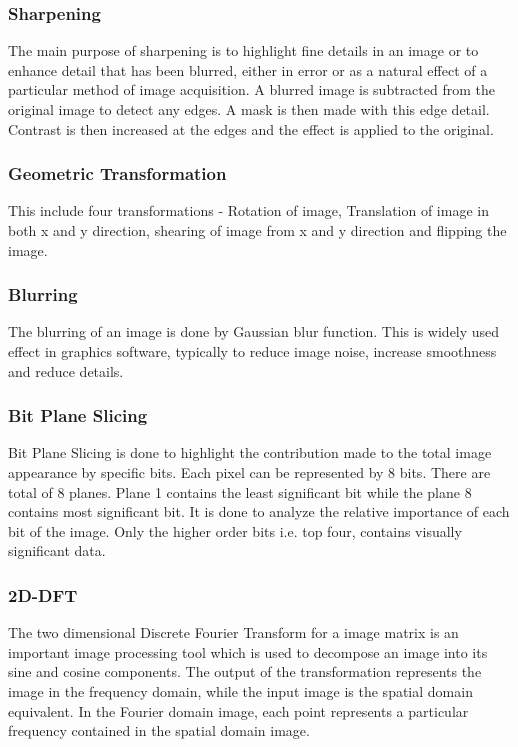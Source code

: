 \subsubsection{Sharpening}
The main purpose of sharpening is to highlight fine details in an image or to enhance detail that has been blurred, either in error or as a natural effect of a particular method of image acquisition. A blurred image is subtracted from the original image to detect any edges. A mask is then made with this edge detail. Contrast is then increased at the edges and the effect is applied to the original.
\\

\subsubsection{Geometric Transformation}
This include four transformations - Rotation of image, Translation of image in both x and y direction, shearing of image from x and y direction and flipping the image.
\\

\subsubsection{Blurring}
The blurring of an image is done by Gaussian blur function. This is widely used effect in graphics software, typically to reduce image noise, increase smoothness and reduce details.
\\

\subsubsection{Bit Plane Slicing}
Bit Plane Slicing is done to highlight the contribution made to the total image appearance by specific bits. Each pixel can be represented by 8 bits. There are total of 8 planes. Plane 1 contains the least significant bit while the plane 8 contains most significant bit. It is done to analyze the relative importance of each bit of the image. Only the higher order bits i.e. top four, contains visually significant data.
\\

\subsubsection{2D-DFT}
The two dimensional Discrete Fourier Transform for a image matrix is an important image processing tool which is used to decompose an image into its sine and cosine components. The output of the transformation represents the image in the frequency domain, while the input image is the spatial domain equivalent. In the Fourier domain image, each point represents a particular frequency contained in the spatial domain image.
\\

